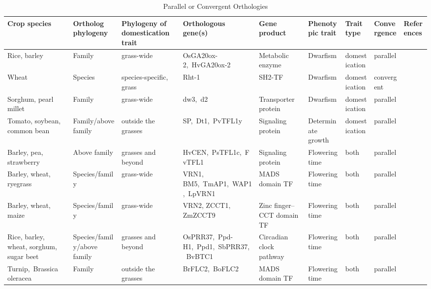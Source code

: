 \documentclass[12pt]{article}
\begin{document}
\begin{table}
\begin{center}
\caption{Parallel or Convergent Orthologies} \label{tab:Ortho}
        \fontsize{7}{8}\selectfont 
    \begin{tabular}{G{3.5cm}G{2.5cm}C{3.10cm}C{3.5cm}C{1.95cm}G{2.0cm}G{1.8cm}G{1.5cm}G{1.5cm}}
\\\toprule  
{\bf Crop species} & {\bf Ortholog phylogeny} & {\bf Phylogeny of domestication trait} & {\bf Orthologous gene(s)} & {\bf Gene product} & {\bf Phenotypic trait} & {\bf Trait type} & {\bf Convergence} & {\bf References} \\\toprule
Rice, barley & Family & grass-wide & OsGA20ox-2, HvGA20ox-2 & Metabolic enzyme & Dwarfism & domestication & parallel & \citep{Asano2007, Asano2011, Jia2009}\\
Wheat & Species & species-specific, grass & Rht-1 & SH2-TF & Dwarfism & domestication & convergent & \citep{Doebley2006}\\
Sorghum, pearl millet & Family & grass-wide & dw3, d2 & Transporter protein & Dwarfism & domestication & parallel & \citep{Multani2003,Parvathaneni2013}\\
Tomato, soybean, common bean & Family/above family & outside the grasses & SP, Dt1, PvTFL1y & Signaling protein & Determinate growth & domestication & parallel & \citep{Doebley2006, Repinski2012, Liu2010, Kwak2012, Tian2010}\\
Barley, pea, strawberry & Above family & grasses and beyond & HvCEN, PsTFL1c, FvTFL1 & Signaling protein & Flowering time & both & parallel & \citep{Comadran2012, Foucher2003, Koskela2012}\\
Barley, wheat, ryegrass & Species/family & grass-wide & VRN1, BM5, TmAP1, WAP1, LpVRN1 & MADS domain TF & Flowering time & both & parallel & \citep{Asp2011}\\
Barley, wheat, maize & Species/family & grass-wide & VRN2, ZCCT1, ZmZCCT9 & Zinc finger–CCT domain TF & Flowering time & both & parallel & \citep{Huang2017}\\
Rice, barley, wheat, sorghum, sugar beet & Species/family/above family & grasses and beyond & OsPRR37, Ppd-H1, Ppd1, SbPRR37, BvBTC1 & Circadian clock pathway & Flowering time & both & parallel & \citep{MURAKAMI2005, Turner2005, Jones2008, Beales2007, Wilhelm2008, Daz2012}\\
Turnip, Brassica oleracea & Family & outside the grasses & BrFLC2, BoFLC2 & MADS domain TF & Flowering time & both & parallel & \citep{Wu2012, Yuan2009, Okazaki2006}\\

\end{tabular}
\end{center}
\end{table}
\end{document}

